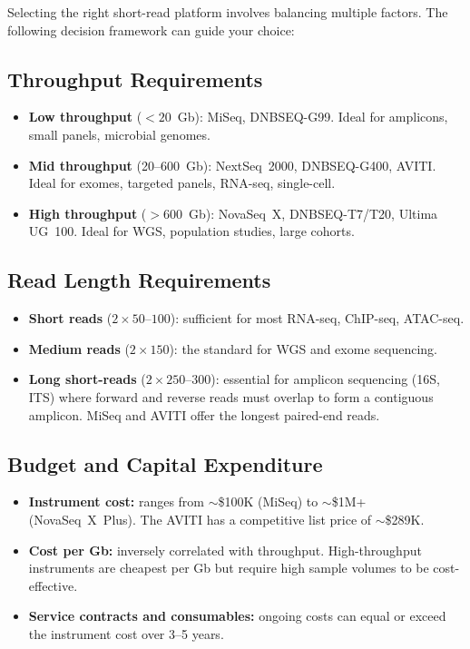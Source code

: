 Selecting the right short-read platform involves balancing multiple factors. The following decision framework can guide your choice:

\subsection{Throughput Requirements}

\begin{itemize}[nosep]
  \item \textbf{Low throughput} ($<20$~Gb): MiSeq, DNBSEQ-G99. Ideal for amplicons, small panels, microbial genomes.
  \item \textbf{Mid throughput} (20--600~Gb): NextSeq~2000, DNBSEQ-G400, AVITI. Ideal for exomes, targeted panels, \gls{RNA-seq}, single-cell.
  \item \textbf{High throughput} ($>600$~Gb): NovaSeq~X, DNBSEQ-T7/T20, Ultima UG~100. Ideal for \gls{WGS}, population studies, large cohorts.
\end{itemize}

\subsection{Read Length Requirements}

\begin{itemize}[nosep]
  \item \textbf{Short reads} ($2 \times 50$--$100$\basepair): sufficient for most \gls{RNA-seq}, \gls{ChIP-seq}, \gls{ATAC-seq}.
  \item \textbf{Medium reads} ($2 \times 150$\basepair): the standard for \gls{WGS} and exome sequencing.
  \item \textbf{Long short-reads} ($2 \times 250$--$300$\basepair): essential for amplicon sequencing (16S, ITS) where forward and reverse reads must overlap to form a contiguous amplicon. MiSeq and AVITI offer the longest paired-end reads.
\end{itemize}

\subsection{Budget and Capital Expenditure}

\begin{itemize}[nosep]
  \item \textbf{Instrument cost:} ranges from ${\sim}$\$100K (MiSeq) to ${\sim}$\$1M+ (NovaSeq~X~Plus). The AVITI has a competitive list price of ${\sim}$\$289K.
  \item \textbf{Cost per Gb:} inversely correlated with throughput. High-throughput instruments are cheapest per Gb but require high sample volumes to be cost-effective.
  \item \textbf{Service contracts and consumables:} ongoing costs can equal or exceed the instrument cost over 3--5 years.
\end{itemize}

